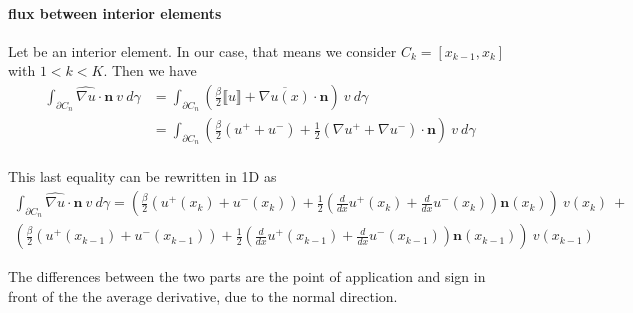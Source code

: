 \documentclass[a4paper,10pt,draft]{article}
\begin{document}
\paragraph{flux between interior elements}

Let be an interior element. In our case, that means we consider $C_k = [x_{k-1},x_k]$ with $1<k<K$. 
Then we have
\begin{align*}
 \int_{\partial C_n} \widehat{\nabla u} \cdot \mathbf{n}\ v\ d\gamma &= \int_{\partial C_n} 
\left(\frac{\beta}{2} \llbracket u \rrbracket + \overline{\nabla u(x)} \cdot \mathbf{n}\right)\ v\ 
d\gamma \\
&= \int_{\partial C_n} \left(\frac{\beta}{2} (u^+ + u^-) + \frac{1}{2} (\nabla u^+ + \nabla u^-)
\cdot \mathbf{n}\right)\ v\ d\gamma \\
\end{align*}

This last equality can be rewritten in 1D as
\begin{multline*}
 \int_{\partial C_n} \widehat{\nabla u} \cdot \mathbf{n}\ v\ d\gamma = \left(\frac{\beta}{2} 
(u^+(x_k) + u^-(x_k)) + \frac{1}{2} \left(\frac{d}{dx} u^+(x_k) + \frac{d}{dx} u^-(x_k)\right) 
\mathbf{n}(x_k) \right)\ v(x_k) \ + \\
\left(\frac{\beta}{2} (u^+(x_{k-1}) + u^-(x_{k-1})) + \frac{1}{2} \left(\frac{d}{dx} u^+(x_{k-1}) + 
\frac{d}{dx} u^-(x_{k-1})\right)\mathbf{n}(x_{k-1}) \right)\ v(x_{k-1})
\end{multline*}

The differences between the two parts are the point of application and sign in front of the the 
average derivative, due to the normal direction.








\end{document}

